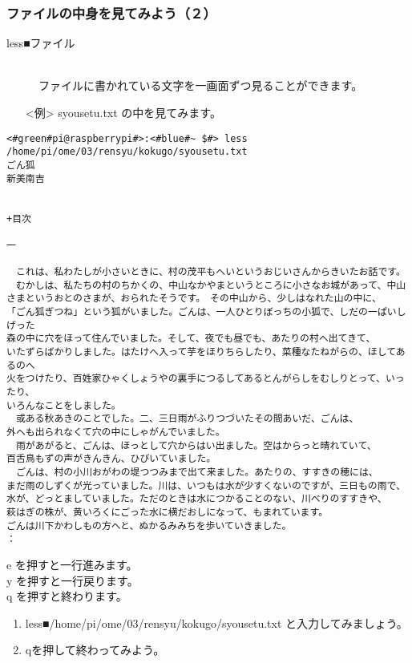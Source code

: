 \subsubsection{ファイルの中身を見てみよう（２）}
\begin{description}
\item[less■ファイル]\mbox{}\\
ファイルに書かれている文字を一画面ずつ見ることができます。
\end{description}
\begin{itemize}
\item[<例>]syousetu.txt の中を見てみます。
\end{itemize}
\begin{lstlisting}[caption=lessの例, label=less]
<#green#pi@raspberrypi#>:<#blue#~ $#> less /home/pi/ome/03/rensyu/kokugo/syousetu.txt
ごん狐
新美南吉


+目次

一

　これは、私わたしが小さいときに、村の茂平もへいというおじいさんからきいたお話です。
　むかしは、私たちの村のちかくの、中山なかやまというところに小さなお城があって、中山
さまというおとのさまが、おられたそうです。　その中山から、少しはなれた山の中に、
「ごん狐ぎつね」という狐がいました。ごんは、一人ひとりぼっちの小狐で、しだの一ぱいしげった
森の中に穴をほって住んでいました。そして、夜でも昼でも、あたりの村へ出てきて、
いたずらばかりしました。はたけへ入って芋をほりちらしたり、菜種なたねがらの、ほしてあるのへ
火をつけたり、百姓家ひゃくしょうやの裏手につるしてあるとんがらしをむしりとって、いったり、
いろんなことをしました。
　或ある秋あきのことでした。二、三日雨がふりつづいたその間あいだ、ごんは、
外へも出られなくて穴の中にしゃがんでいました。
　雨があがると、ごんは、ほっとして穴からはい出ました。空はからっと晴れていて、
百舌鳥もずの声がきんきん、ひびいていました。
　ごんは、村の小川おがわの堤つつみまで出て来ました。あたりの、すすきの穂には、
まだ雨のしずくが光っていました。川は、いつもは水が少すくないのですが、三日もの雨で、
水が、どっとましていました。ただのときは水につかることのない、川べりのすすきや、
萩はぎの株が、黄いろくにごった水に横だおしになって、もまれています。
ごんは川下かわしもの方へと、ぬかるみみちを歩いていきました。
：
\end{lstlisting}
e を押すと一行進みます。\\
y を押すと一行戻ります。\\
q を押すと終わります。\\
\begin{tcolorbox}[title=\useOmetoi]
\begin{enumerate}
\item less■/home/pi/ome/03/rensyu/kokugo/syousetu.txt と入力してみましょう。\\
\item qを押して終わってみよう。\\
\end{enumerate}
\end{tcolorbox}


